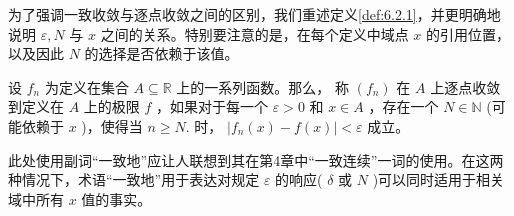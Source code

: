 为了强调一致收敛与逐点收敛之间的区别，我们重述定义\ref{def:6.2.1}，并更明确地说明 \(\varepsilon ,N\) 与 \(x\) 之间的关系。特别要注意的是，在每个定义中域点 \(x\) 的引用位置，以及因此 \(N\) 的选择是否依赖于该值。

\addtocounter{Thm}{-3}

\begin{Def}
  设 \({f}_{n}\) 为定义在集合 \(A \subseteq  \mathbb{R}\) 上的一系列函数。那么， 称 \(\left( {f}_{n}\right)\) 在 \(A\) 上逐点收敛到定义在 \(A\) 上的极限 \(f\) ，如果对于每一个 \(\varepsilon  > 0\) 和 \(x \in  A\) ，存在一个 \(N \in  \mathbb{N}\) (可能依赖于 \(x\) )，使得当 \(n \geq  N.\) 时， \(\left| {{f}_{n}\left( x\right)  - f\left( x\right) }\right|  < \varepsilon\) 成立。
\end{Def}

\addtocounter{Thm}{2}

此处使用副词“一致地”应让人联想到其在第4章中“一致连续”一词的使用。在这两种情况下，术语“一致地”用于表达对规定 \(\varepsilon\) 的响应( \(\delta\) 或 \(N\) )可以同时适用于相关域中所有 \(x\) 值的事实。


